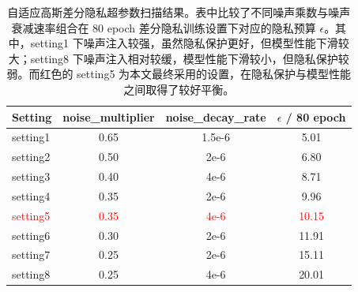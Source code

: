 \begin{table}[!htb]
\centering
\caption{自适应高斯差分隐私超参数扫描结果。表中比较了不同噪声乘数与噪声衰减速率组合在 80 epoch 差分隐私训练设置下对应的隐私预算 $\epsilon$。其中，setting1 下噪声注入较强，虽然隐私保护更好，但模型性能下滑较大；setting8 下噪声注入相对较缓，模型性能下滑较小，但隐私保护较弱。而红色的 setting5 为本文最终采用的设置，在隐私保护与模型性能之间取得了较好平衡。}
\label{tab:privacy-scan}
\begin{tabular}{lccc}
\toprule
Setting & noise\_multiplier & noise\_decay\_rate & $\epsilon$ / 80 epoch \\
\midrule
setting1 & 0.65 & 1.5e-6 & 5.01 \\
setting2 & 0.50 & 2e-6 & 6.80 \\
setting3 & 0.40 & 4e-6 & 8.71 \\
setting4 & 0.35 & 2e-6 & 9.96 \\
\textcolor{red}{setting5} & \textcolor{red}{0.35} & \textcolor{red}{4e-6} & \textcolor{red}{10.15} \\
setting6 & 0.30 & 2e-6 & 11.91 \\
setting7 & 0.25 & 2e-6 & 15.11 \\
setting8 & 0.25 & 4e-6 & 20.01 \\
\bottomrule
\end{tabular}
\end{table}
